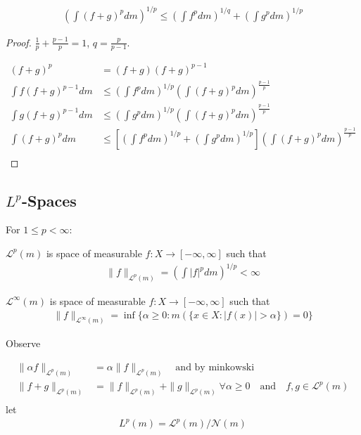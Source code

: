 \begin{corollary}
\begin{align*}
	\left( \int (f + g)^{p} dm \right)^{1/p} \leq \left( \int f^{p} dm \right)^{1/q} + \left( \int g^{p} dm \right)^{1/p}
\end{align*} 	
\end{corollary}

\begin{proof}
	$\frac{1}{p} + \frac{p-1}{p} = 1$, $q = \frac{p}{p-1}$.

	\begin{align*}
		(f + g)^{p} &= (f+g) ( f+g)^{p-1} \\
		\int f ( f + g)^{p-1} dm &\leq \left( \int f^{p} dm \right)^{1/p} \left( \int (f+g)^{p} dm \right)^{\frac{p-1}{p}} \\
		\int g ( f + g)^{p-1} dm &\leq \left( \int g^{p} dm \right)^{1/p} \left( \int (f+g)^{p} dm \right)^{\frac{p-1}{p}} \\
	\int ( f + g)^{p} dm &\leq \left[ \left( \int f^{p} dm \right)^{1/p} + \left( \int g^{p} dm \right)^{1/p} \right] \left( \int (f+g)^{p} dm \right)^{\frac{p-1}{p}} \\
	\end{align*} 
\end{proof}

\subsection{$L^{p}$-Spaces}

\noindent For $1 \leq p < \infty$:

\noindent $\mathcal{L}^{p} (m)$ is space of measurable $f : X \to [-\infty, \infty]$ such that
 \begin{align*}
	\|f\|_{\mathcal{L}^{p} (m)} = \left( \int |f|^{p} dm \right)^{1/p} < \infty
\end{align*} 



\noindent $\mathcal{L}^{\infty} (m)$ is space of measurable $f : X \to [-\infty, \infty]$ such that
 \begin{align*}
 \|f\|_{\mathcal{L}^{\infty} (m)} = \inf\{\alpha \geq 0 : m ( \{ x \in X : |f(x)| > \alpha \}) =0 \}
\end{align*} 

Observe

\begin{align*}
	\|\alpha f\|_{\mathcal{L}^{p}(m)} &= \alpha \|f \|_{\mathcal{L}^{p} (m)} \quad \text{and by minkowski} \\
	\| f + g\|_{\mathcal{L}^{p}(m)} &=  \|f \|_{\mathcal{L}^{p} (m)} + \|g \|_{\mathcal{L}^{p} (m)}  \forall \alpha \geq 0 \quad \text{and} \quad f,g \in \mathcal{L}^{p} (m) \\
\end{align*} 
 let 
 \begin{align*}
 	L^{p} (m) = \mathcal{L}^{p} (m) / \mathscr{N} (m)
 \end{align*} 


